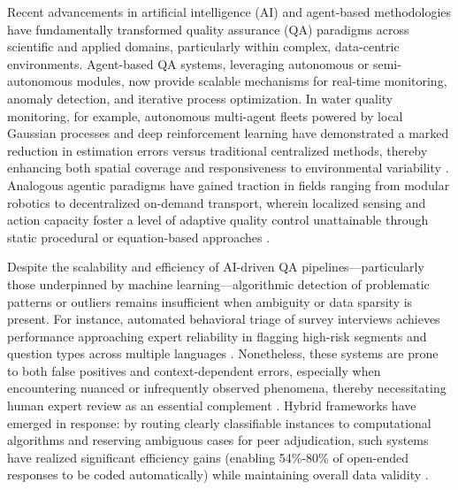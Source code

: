 \documentclass[sigconf]{acmart}
\begin{document}
Recent advancements in artificial intelligence (AI) and agent-based methodologies have fundamentally transformed quality assurance (QA) paradigms across scientific and applied domains, particularly within complex, data-centric environments. Agent-based QA systems, leveraging autonomous or semi-autonomous modules, now provide scalable mechanisms for real-time monitoring, anomaly detection, and iterative process optimization. In water quality monitoring, for example, autonomous multi-agent fleets powered by local Gaussian processes and deep reinforcement learning have demonstrated a marked reduction in estimation errors versus traditional centralized methods, thereby enhancing both spatial coverage and responsiveness to environmental variability \cite{ref92}\cite{ref112}. Analogous agentic paradigms have gained traction in fields ranging from modular robotics to decentralized on-demand transport, wherein localized sensing and action capacity foster a level of adaptive quality control unattainable through static procedural or equation-based approaches \cite{ref93}\cite{ref97}\cite{ref98}\cite{ref113}\cite{ref114}\cite{ref115}.

Despite the scalability and efficiency of AI-driven QA pipelines—particularly those underpinned by machine learning—algorithmic detection of problematic patterns or outliers remains insufficient when ambiguity or data sparsity is present. For instance, automated behavioral triage of survey interviews achieves performance approaching expert reliability in flagging high-risk segments and question types across multiple languages \cite{ref92}\cite{ref93}\cite{ref97}\cite{ref98}. Nonetheless, these systems are prone to both false positives and context-dependent errors, especially when encountering nuanced or infrequently observed phenomena, thereby necessitating human expert review as an essential complement \cite{ref92}\cite{ref96}. Hybrid frameworks have emerged in response: by routing clearly classifiable instances to computational algorithms and reserving ambiguous cases for peer adjudication, such systems have realized significant efficiency gains (enabling 54\%-80\% of open-ended responses to be coded automatically) while maintaining overall data validity \cite{ref88}\cite{ref89}\cite{ref91}\cite{ref92}\cite{ref98}.
\end{document}
